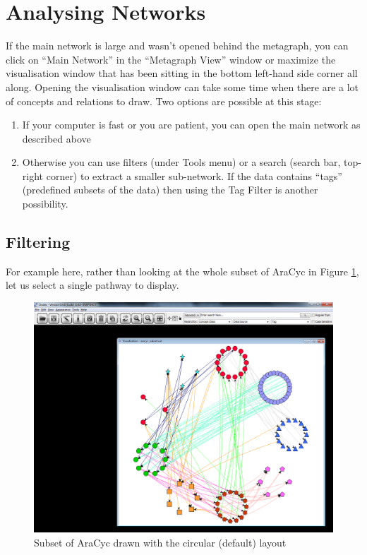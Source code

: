 \section{Analysing Networks}
\label{sec:analysing}
If the main network is large and wasn't opened behind the metagraph, you can click on ``Main Network'' in the ``Metagraph View'' window or maximize the visualisation window that has been sitting in the bottom left-hand side corner all along.
Opening the visualisation window can take some time when there are a lot of concepts and relations to draw.
Two options are possible at this stage:
\begin{enumerate}
\item If your computer is fast or you are patient, you can open the main network as described above
\item Otherwise you can use filters (under Tools menu) or a search (search bar, top-right corner) to extract a smaller sub-network.
If the data contains ``tags'' (predefined subsets of the data) then using the Tag Filter is another possibility.
\end{enumerate}

\subsection{Filtering}
\label{sec:filtering}

For example here, rather than looking at the whole subset of AraCyc in Figure \ref{fig:complete_subset_aracyc}, 
let us select a single pathway to display.

\begin{figure}[H]
\centering
\includegraphics[scale=0.3]{images/Jun12/aracyc_circular_subset.png} 
\caption{Subset of AraCyc drawn with the circular (default) layout}
\label{fig:complete_subset_aracyc}
\end{figure}

